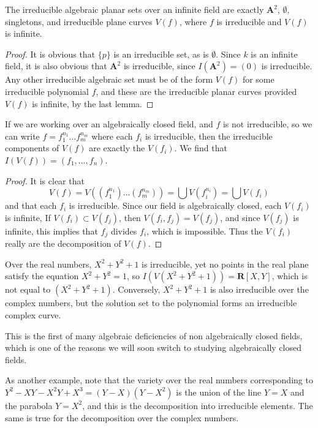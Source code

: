 \begin{corollary}
    The irreducible algebraic planar sets over an infinite field are exactly $\mathbf{A}^2$, $\emptyset$, singletons, and irreducible plane curves $V(f)$, where $f$ is irreducible and $V(f)$ is infinite.
\end{corollary}
\begin{proof}
    It is obvious that $\{ p \}$ is an irreducible set, as is $\emptyset$. Since $k$ is an infinite field, it is also obvious that $\mathbf{A}^2$ is irreducible, since $I(\mathbf{A}^2) = (0)$ is irreducible. Any other irreducible algebraic set must be of the form $V(f)$ for some irreducible polynomial $f$, and these are the irreducible planar curves provided $V(f)$ is infinite, by the last lemma.
\end{proof}

\begin{corollary}
    If we are working over an algebraically closed field, and $f$ is not irreducible, so we can write $f = f_1^{n_1} \dots f_m^{n_m}$ where each $f_i$ is irreducible, then the irreducible components of $V(f)$ are exactly the $V(f_i)$. We find that $I(V(f)) = (f_1, \dots, f_n)$.
\end{corollary}
\begin{proof}
    It is clear that
    \[ V(f) = V((f_1^{n_1}) \dots (f_m^{n_m})) = \bigcup V(f_i^{n_i}) = \bigcup V(f_i) \]
    and that each $f_i$ is irreducible. Since our field is algebraically closed, each $V(f_i)$ is infinite, If $V(f_i) \subset V(f_j)$, then $V(f_i,f_j) = V(f_j)$, and since $V(f_j)$ is infinite, this implies that $f_j$ divides $f_i$, which is impossible. Thus the $V(f_i)$ really are the decomposition of $V(f)$.
\end{proof}

\begin{example}
    Over the real numbers, $X^2 + Y^2 + 1$ is irreducible, yet no points in the real plane satisfy the equation $X^2 + Y^2 = 1$, so $I(V(X^2 + Y^2 + 1)) = \mathbf{R}[X,Y]$, which is not equal to $(X^2 + Y^2 + 1)$. Conversely, $X^2 + Y^2 + 1$ is also irreducible over the complex numbers, but the solution set to the polynomial forms an irreducible complex curve.
\end{example}

This is the first of many algebraic deficiencies of non algebraically closed fields, which is one of the reasons we will soon switch to studying algebraically closed fields.

\begin{example}
    As another example, note that the variety over the real numbers corresponding to $Y^2 - XY - X^2Y + X^3 = (Y - X)(Y - X^2)$ is the union of the line $Y = X$ and the parabola $Y = X^2$, and this is the decomposition into irreducible elements. The same is true for the decomposition over the complex numbers.
\end{example}


